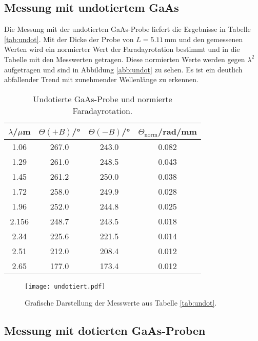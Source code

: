 \subsection{Messung mit undotiertem GaAs}
\label{sec:undotiert}

Die Messung mit der undotierten GaAs-Probe liefert die Ergebnisse in Tabelle \ref{tab:undot}.
Mit der Dicke der Probe von $L=5.11\,$mm und den gemessenen Werten wird ein normierter Wert der Faradayrotation bestimmt und in die Tabelle mit den Messwerten getragen.
Diese normierten Werte werden gegen $\lambda^2$ aufgetragen und sind in Abbildung \ref{abb:undot} zu sehen.
Es ist ein deutlich abfallender Trend mit zunehmender Wellenlänge zu erkennen.

\begin{table}
  \centering
  \caption{Undotierte GaAs-Probe und normierte Faradayrotation.}
  \label{tab:magFeld}
  \begin{tabular}{c | c | c | c}
    \toprule
    $\lambda$/$\mu$m & $\Theta(+B)$/° & $\Theta(-B)$/°& $\Theta_{\text{norm}}$/rad/mm \\
    \midrule
    1.06 & 267.0 & 243.0 & 0.082 \\
    1.29 & 261.0 & 248.5 & 0.043 \\
    1.45 & 261.2 & 250.0 & 0.038 \\
    1.72 & 258.0 & 249.9 & 0.028 \\
    1.96 & 252.0 & 244.8 & 0.025 \\
    2.156 & 248.7 & 243.5 & 0.018 \\
    2.34 & 225.6 & 221.5 & 0.014 \\
    2.51 & 212.0 & 208.4 & 0.012 \\
    2.65 & 177.0 & 173.4 & 0.012 \\
    \bottomrule
  \end{tabular}
\end{table}
\FloatBarrier

\begin{figure}
  \centering
  \texttt{[image: undotiert.pdf]}
  \caption{Grafische Darstellung der Messwerte aus Tabelle \ref{tab:undot}.}
  \label{abb:magFeld}
\end{figure}
\FloatBarrier

\subsection{Messung mit dotierten GaAs-Proben}
\label{sec:dot}

